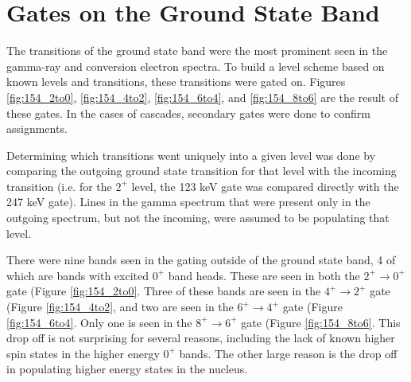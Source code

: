\afterpage{\clearpage}

\afterpage{\clearpage}


\section{Gates on the Ground State Band}
\label{sec:154GS_Gates}

The transitions of the ground state band were the most prominent seen in the gamma-ray and conversion electron spectra. To build a level scheme based on known levels and transitions, these transitions were gated on. Figures \ref{fig:154_2to0}, \ref{fig:154_4to2}, \ref{fig:154_6to4}, and \ref{fig:154_8to6} are the result of these gates. In the cases of cascades, secondary gates were done to confirm assignments.

Determining which transitions went uniquely into a given level was done by comparing the outgoing ground state transition for that level with the incoming transition (i.e. for the $2^+$ level, the 123 keV gate was compared directly with the 247 keV gate). Lines in the gamma spectrum that were present only in the outgoing spectrum, but not the incoming, were assumed to be populating that level.

There were nine bands seen in the gating outside of the ground state band, 4 of which are bands with excited $0^+$ band heads. These are seen in both the $2^+\rightarrow0^+$ gate (Figure \ref{fig:154_2to0}. Three of these bands are seen in the $4^+\rightarrow2^+$ gate (Figure \ref{fig:154_4to2}, and two are seen in the $6^+\rightarrow4^+$ gate (Figure \ref{fig:154_6to4}. Only one is seen in the $8^+\rightarrow6^+$ gate (Figure \ref{fig:154_8to6}. This drop off is not surprising for several reasons, including the lack of known higher spin states in the higher energy $0^+$ bands. The other large reason is the drop off in populating higher energy states in the nucleus.

